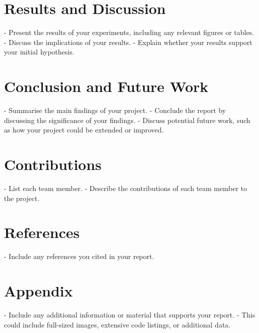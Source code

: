 \documentclass{article}
\begin{document}
\section{Results and Discussion}
\label{sec:results_and_discussion}
- Present the results of your experiments, including any relevant figures or
tables.
- Discuss the implications of your results.
- Explain whether your results support your initial hypothesis.

\section{Conclusion and Future Work}
\label{sec:conclusion_and_future_work}
- Summarise the main findings of your project.
- Conclude the report by discussing the significance of your findings.
- Discuss potential future work, such as how your project could be extended or
improved.

\section{Contributions}
\label{sec:contributions}
- List each team member.
- Describe the contributions of each team member to the project.

\section{References}
\label{sec:references}
- Include any references you cited in your report.

\section{Appendix}
\label{sec:appendix}
- Include any additional information or material that supports your report.
- This could include full-sized images, extensive code listings, or additional
data.
\end{document}
